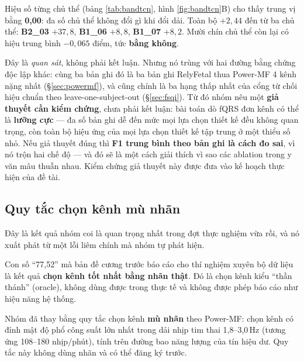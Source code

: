 \begin{ghichu}[title={Hiệu ứng không phân bố đều --- nó dồn vào đúng ba chủ thể}]
Hiệu số từng chủ thể (bảng \ref{tab:bandtcn}, hình \ref{fig:bandtcn}B) cho thấy trung vị bằng
\textbf{0,00}: đa số chủ thể không đổi gì khi đổi dải. Toàn bộ $+2{,}44$ đến từ ba chủ thể:
\textbf{B2\_03} $+37{,}8$, \textbf{B1\_06} $+8{,}8$, \textbf{B1\_07} $+8{,}2$. Mười chín chủ thể còn
lại có hiệu trung bình $-0{,}065$ điểm, tức \textbf{bằng không}.

Đây là \textit{quan sát}, không phải kết luận. Nhưng nó trùng với hai đường bằng chứng độc lập khác:
cùng ba bản ghi đó là ba bản ghi RelyFetal thua Power-MF 4 kênh nặng nhất (\S\ref{sec:powermf}), và
cũng chính là ba hạng thấp nhất của cổng từ chối hiệu chuẩn theo leave-one-subject-out
(\S\ref{sec:fsqi}). Từ đó nhóm nêu một \textbf{giả thuyết cần kiểm chứng}, chưa phải kết luận: bài toán
dò fQRS đơn kênh có thể là \textbf{lưỡng cực} --- đa số bản ghi dễ đến mức mọi lựa chọn thiết kế đều
không quan trọng, còn toàn bộ hiệu ứng của mọi lựa chọn thiết kế tập trung ở một thiểu số nhỏ. Nếu giả
thuyết đúng thì \textbf{F1 trung bình theo bản ghi là cách đo sai}, vì nó trộn hai chế độ --- và đó sẽ
là một cách giải thích vì sao các ablation trong y văn mâu thuẫn nhau. Kiểm chứng giả thuyết này được
đưa vào kế hoạch thực hiện của đề tài.
\end{ghichu}



\subsection{Quy tắc chọn kênh mù nhãn}
\label{sec:chonkenh}

Đây là kết quả nhóm coi là quan trọng nhất trong đợt thực nghiệm vừa rồi, và nó xuất phát từ một
lỗi liêm chính mà nhóm tự phát hiện.

\begin{canhbao}[title={Lỗi nhóm tự phát hiện và đã sửa}]
Con số ``77,52'' mà bản đề cương trước báo cáo cho thí nghiệm xuyên bộ dữ liệu là kết quả
\textbf{chọn kênh tốt nhất bằng nhãn thật}. Đó là chọn kênh kiểu ``thần thánh'' (oracle), không dùng
được trong thực tế và không được phép báo cáo như hiệu năng hệ thống.
\end{canhbao}

Nhóm đã thay bằng quy tắc chọn kênh \textbf{mù nhãn} theo Power-MF: chọn kênh có đỉnh mật độ phổ công
suất lớn nhất trong dải nhịp tim thai 1,8--3,0\,Hz (tương ứng 108--180 nhịp/phút), tính trên đường bao
năng lượng của tín hiệu dư. Quy tắc này không dùng nhãn và có thể đăng ký trước.

